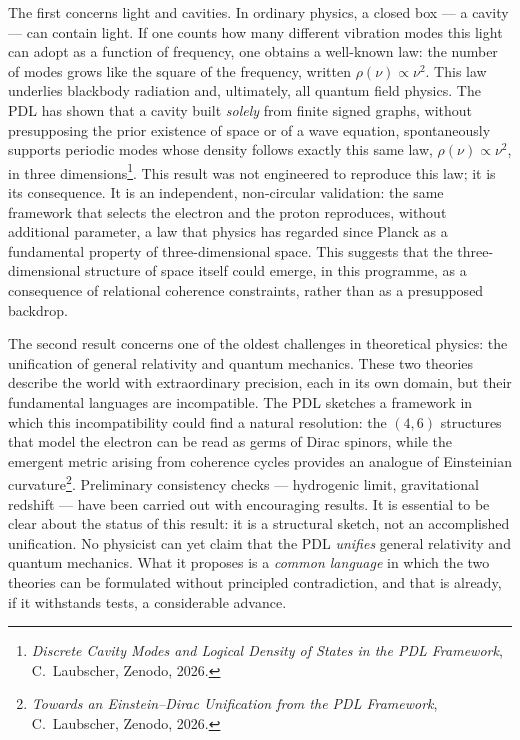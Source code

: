 \documentclass[11pt, a4paper, openright]{book}
\begin{document}
The first concerns light and cavities. In ordinary physics, a closed box — a cavity — can contain light. If one counts how many different vibration modes this light can adopt as a function of frequency, one obtains a well-known law: the number of modes grows like the square of the frequency, written $\rho(\nu) \propto \nu^2$. This law underlies blackbody radiation and, ultimately, all quantum field physics. The PDL has shown that a cavity built \emph{solely} from finite signed graphs, without presupposing the prior existence of space or of a wave equation, spontaneously supports periodic modes whose density follows exactly this same law, $\rho(\nu) \propto \nu^2$, in three dimensions\footnote{\textit{Discrete Cavity Modes and Logical Density of States in the PDL Framework}, C.~Laubscher, Zenodo, 2026.}. This result was not engineered to reproduce this law; it is its consequence. It is an independent, non-circular validation: the same framework that selects the electron and the proton reproduces, without additional parameter, a law that physics has regarded since Planck as a fundamental property of three-dimensional space. This suggests that the three-dimensional structure of space itself could emerge, in this programme, as a consequence of relational coherence constraints, rather than as a presupposed backdrop.

\medskip

The second result concerns one of the oldest challenges in theoretical physics: the unification of general relativity and quantum mechanics. These two theories describe the world with extraordinary precision, each in its own domain, but their fundamental languages are incompatible. The PDL sketches a framework in which this incompatibility could find a natural resolution: the $(4,6)$ structures that model the electron can be read as germs of Dirac spinors, while the emergent metric arising from coherence cycles provides an analogue of Einsteinian curvature\footnote{\textit{Towards an Einstein--Dirac Unification from the PDL Framework}, C.~Laubscher, Zenodo, 2026.}. Preliminary consistency checks — hydrogenic limit, gravitational redshift — have been carried out with encouraging results. It is essential to be clear about the status of this result: it is a structural sketch, not an accomplished unification. No physicist can yet claim that the PDL \emph{unifies} general relativity and quantum mechanics. What it proposes is a \emph{common language} in which the two theories can be formulated without principled contradiction, and that is already, if it withstands tests, a considerable advance.
\end{document}
